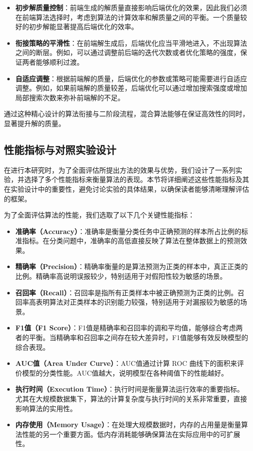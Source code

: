 \documentclass[12pt,a4paper,twoside]{ctexbook}
\begin{document}
\begin{itemize}
    \item \textbf{初步解质量控制}：前端生成的解质量直接影响后端优化的效果，因此我们必须在前端算法选择时，考虑到算法的计算效率和解质量之间的平衡。一个质量较好的初步解能显著提高后端优化的效率。
    \item \textbf{衔接策略的平滑性}：在前端解生成后，后端优化应当平滑地进入，不出现算法之间的断层。例如，可以通过调整前后端的迭代次数或者优化策略的强度，保证两者能够顺利过渡。
    \item \textbf{自适应调整}：根据前端解的质量，后端优化的参数或策略可能需要进行自适应调整。例如，如果前端解的质量较差，后端优化可以通过增加搜索强度或增加局部搜索次数来弥补前端解的不足。
\end{itemize}

通过这种精心设计的算法衔接与二阶段流程，混合算法能够在保证高效性的同时，显著提升解的质量。

\subsection{性能指标与对照实验设计}

在进行本研究时，为了全面评估所提出方法的效果与优势，我们设计了一系列实验，并选择了多个性能指标来衡量算法的表现。本节将详细阐述这些性能指标及其在实验设计中的重要性，避免讨论实验的具体结果，以确保读者能够清晰理解评估的框架。

为了全面评估算法的性能，我们选取了以下几个关键性能指标：

\begin{itemize}
    \item \textbf{准确率（Accuracy）}：准确率是衡量分类任务中正确预测的样本所占比例的标准指标。在分类问题中，准确率的高低直接反映了算法在整体数据上的预测效果。
    \item \textbf{精确率（Precision）}：精确率衡量的是算法预测为正类的样本中，真正正类的比例。精确率高说明误报较少，特别适用于对假阳性较为敏感的场景。
    \item \textbf{召回率（Recall）}：召回率是指所有正类样本中被正确预测为正类的比例。召回率高表明算法对正类样本的识别能力较强，特别适用于对漏报较为敏感的场景。
    \item \textbf{F1值（F1 Score）}：F1值是精确率和召回率的调和平均值，能够综合考虑两者的平衡。当精确率和召回率之间存在较大差异时，F1值能够有效反映模型的综合表现。
    \item \textbf{AUC值（Area Under Curve）}：AUC值通过计算 ROC 曲线下的面积来评价模型的分类性能。AUC值越大，说明模型在各种阈值下的性能越好。
    \item \textbf{执行时间（Execution Time）}：执行时间是衡量算法运行效率的重要指标。尤其在大规模数据集下，算法的计算复杂度与执行时间的关系非常重要，直接影响算法的实用性。
    \item \textbf{内存使用（Memory Usage）}：在处理大规模数据时，内存的占用量是衡量算法性能的另一个重要方面。低内存消耗能够确保算法在实际应用中的可扩展性。
\end{itemize}
\end{document}
